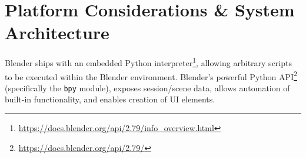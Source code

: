 \section{Platform Considerations \& System Architecture}

Blender ships with an embedded Python interpreter\footnote{\url{https://docs.blender.org/api/2.79/info_overview.html}}, allowing arbitrary scripts to be executed within the Blender environment.
Blender's powerful Python API\footnote{\url{https://docs.blender.org/api/2.79/}} (specifically the \texttt{bpy} module), exposes session/scene data, allows automation of built-in functionality, and enables creation of UI elements.

